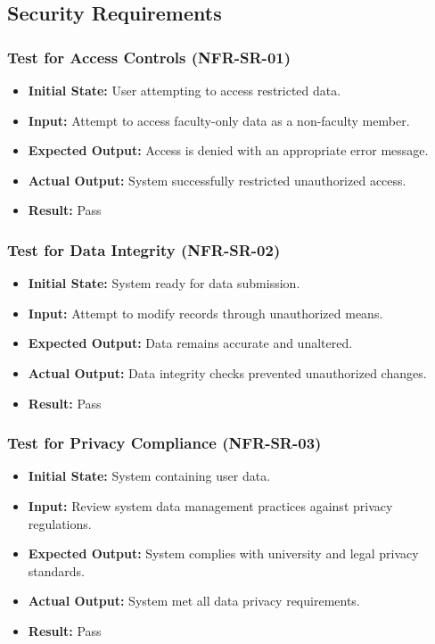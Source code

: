 \documentclass[12pt, titlepage]{article}
\begin{document}
\subsection{Security Requirements}

\subsubsection{Test for Access Controls (NFR-SR-01)}
\begin{itemize}
    \item \textbf{Initial State: }User attempting to access restricted data.
    \item \textbf{Input: }Attempt to access faculty-only data as a non-faculty member.
    \item \textbf{Expected Output: }Access is denied with an appropriate error message.
    \item \textbf{Actual Output: }System successfully restricted unauthorized access.
    \item \textbf{Result: }Pass
\end{itemize}

\subsubsection{Test for Data Integrity (NFR-SR-02)}
\begin{itemize}
    \item \textbf{Initial State: }System ready for data submission.
    \item \textbf{Input: }Attempt to modify records through unauthorized means.
    \item \textbf{Expected Output: }Data remains accurate and unaltered.
    \item \textbf{Actual Output: }Data integrity checks prevented unauthorized changes.
    \item \textbf{Result: }Pass
\end{itemize}

\subsubsection{Test for Privacy Compliance (NFR-SR-03)}
\begin{itemize}
    \item \textbf{Initial State: }System containing user data.
    \item \textbf{Input: }Review system data management practices against privacy regulations.
    \item \textbf{Expected Output: }System complies with university and legal privacy standards.
    \item \textbf{Actual Output: }System met all data privacy requirements.
    \item \textbf{Result: }Pass
\end{itemize}
\end{document}
